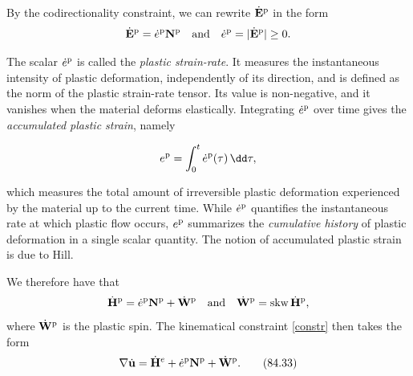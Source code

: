 By the codirectionality constraint, we can rewrite \( \dot{\mathbf{E}}^{\rm p} \) in the form
\[
\dot{\mathbf{E}}^{\rm p} = \dot{e}^{\rm p} \mathbf{N}^{\rm p}
\quad \text{and} \quad
\dot{e}^{\rm p} = |\dot{\mathbf{E}}^{\rm p}| \geq 0.
\]

The scalar $\dot{e}^{\rm p} $ is called the \textit{ plastic strain-rate}. It measures the instantaneous intensity of plastic deformation, independently of its direction, and is defined as the norm of the plastic strain-rate tensor. Its value is non-negative, and it vanishes when the material deforms elastically. Integrating  $\dot{e}^{\rm p} $ over time gives the \textit{accumulated  plastic strain}, namely
\begin{definition}
	\begin{equation}
e^{\rm p}=\int_0^t\dot{e}^{\rm p} (\tau)\,\dd \tau,
\end{equation}
\end{definition}
which measures the total amount of irreversible plastic deformation experienced by the material up to the current time. While $\dot{e}^{\rm p} $ quantifies the instantaneous rate at which plastic flow occurs, $e^{\rm p}$ summarizes the \textit{cumulative history} of plastic deformation in a single scalar quantity. The notion of accumulated plastic strain is due to Hill.

We therefore have that
\[
\dot{\mathbf{H}}^{\rm p} = \dot{e}^{\rm p} \mathbf{N}^{\rm p} + \dot{\mathbf{W}}^{\rm p}
\quad \text{and} \quad
\dot{\mathbf{W}}^{\rm p} = \mathrm{skw}\, \dot{\mathbf{H}}^{\rm p},
\]
where \( \dot{\mathbf{W}}^{\rm p} \) is the plastic spin. The kinematical constraint \eqref{constr} then takes the form
\[
\nabla \dot{\mathbf{u}} = \dot{\mathbf{H}}^e + \dot{e}^{\rm p} \mathbf{N}^{\rm p} + \dot{\mathbf{W}}^{\rm p}. \tag{84.33}
\]


